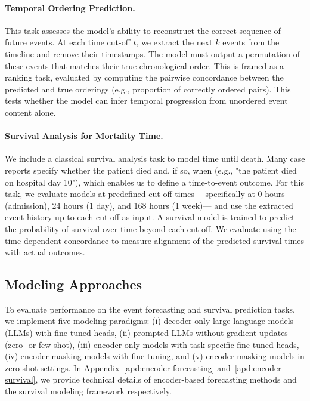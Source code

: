 \documentclass[letterpaper]{article} %
\begin{document}
\paragraph{Temporal Ordering Prediction.} 
This task assesses the model's ability to reconstruct the correct sequence of future events. 
At each time cut-off $t$, we extract the next $k$ events from the timeline and remove their timestamps. 
The model must output a permutation of these events that matches their true chronological order.
This is framed as a ranking task, evaluated by computing the pairwise concordance between the predicted and true orderings (e.g., proportion of correctly ordered pairs). 
This tests whether the model can infer temporal progression from unordered event content alone.

\paragraph{Survival Analysis for Mortality Time.}  
We include a classical survival analysis task to model time until death. 
Many case reports specify whether the patient died and, if so, when (e.g., "the patient died on hospital day 10"), which enables us to define a time-to-event outcome. 
For this task, we evaluate models at predefined cut-off times--- specifically at 0 hours (admission), 24 hours (1 day), and 168 hours (1 week)--- and use the extracted event history up to each cut-off as input. 
A survival model is trained to predict the probability of survival over time beyond each cut-off. 
We evaluate using the time-dependent concordance to measure alignment of the predicted survival times with actual outcomes.

\subsection{Modeling Approaches}
To evaluate performance on the event forecasting and survival prediction tasks, we implement five modeling paradigms: (i) decoder-only large language models (LLMs) with fine-tuned heads, (ii) prompted LLMs without gradient updates (zero- or few-shot), (iii) encoder-only models with task-specific fine-tuned heads, (iv) encoder-masking models with fine-tuning, and (v) encoder-masking models in zero-shot settings. In Appendix~\ref{apd:encoder-forecasting} and~\ref{apd:encoder-survival}, we provide technical details of encoder-based forecasting methods and the survival modeling framework respectively.
\end{document}
